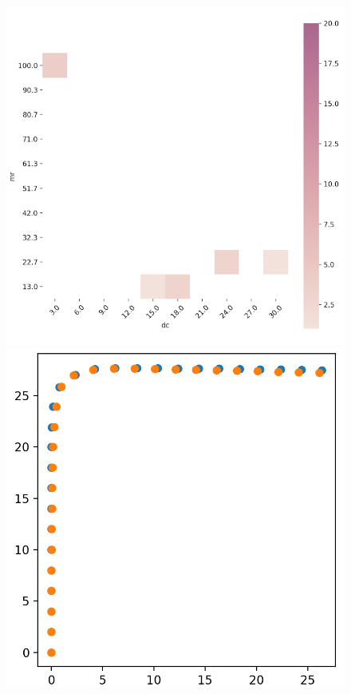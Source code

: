 \documentclass[conference]{IEEEtran}
\begin{document}
\begin{figure}[t]
\includegraphics[width=\linewidth]{images/feature_cubetown}
\endminipage\hfill
{}
\includegraphics[width=\linewidth]{images/two_roads_same_cell.png}

\end{figure}
\end{document}
